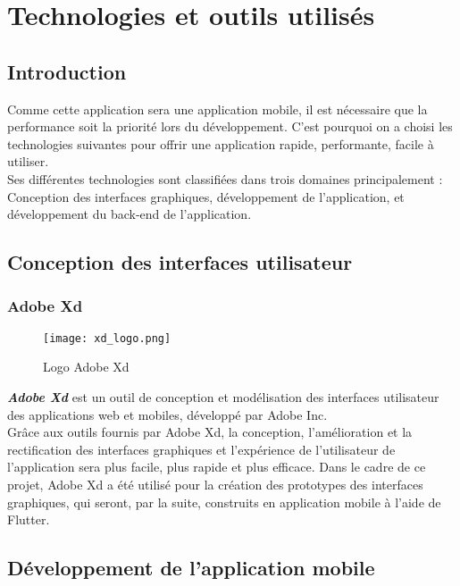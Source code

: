 \chapter{Technologies et outils utilisés}
\minitoc
\clearpage
\section{Introduction}
Comme cette application sera une application mobile, il est nécessaire que la performance soit la priorité lors du développement. C'est pourquoi on a choisi les technologies suivantes pour offrir une application rapide, performante, facile à utiliser.\\
\noindent Ses différentes technologies sont classifiées dans trois domaines principalement : Conception des interfaces graphiques, développement de l'application, et développement du back-end de l'application.\\
\section{Conception des interfaces utilisateur}
\subsection{Adobe Xd}
\vspace{1cm}
\begin{figure}[H]
    \centering
    \texttt{[image: xd\_logo.png]}
    \vspace{1cm}
    \captionsetup{justification=centering}

    \caption{Logo Adobe Xd}
    \label{fig:xd_logo}
\end{figure}
\textit{\textbf{Adobe Xd}} \cite{adobe_xd} est un outil de conception et modélisation des interfaces utilisateur des applications web et mobiles, développé par Adobe Inc.\\
\noindent Grâce aux outils fournis par Adobe Xd, la conception, l'amélioration et la rectification des interfaces graphiques et l'expérience de l'utilisateur de l'application sera plus facile, plus rapide et plus efficace.
\noindent Dans le cadre de ce projet, Adobe Xd a été utilisé pour la création des prototypes des interfaces graphiques, qui seront, par la suite, construits en application mobile à l'aide de Flutter.
\section{Développement de l'application mobile}
